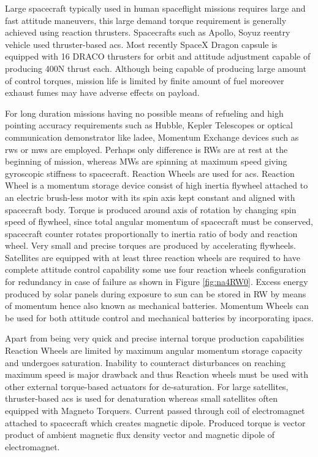 Large spacecraft typically used in human spaceflight missions requires large and fast attitude maneuvers, this large demand torque requirement is generally achieved using reaction thrusters. Spacecrafts such as Apollo, Soyuz reentry vehicle used thruster-based \acrshort{acs}. Most recently SpaceX Dragon capsule is equipped with 16 DRACO thrusters \cite{web:SpaceXDargon} for orbit and attitude adjustment capable of producing 400N thrust each.\cite{book:SPACEX} Although being capable of producing large amount of control torques, mission life is limited by finite amount of fuel moreover exhaust fumes may have adverse effects on payload.

For long duration missions having no possible means of refueling and high pointing accuracy requirements such as Hubble, Kepler Telescopes or optical communication demonstrator like \acrfull{ladee}, Momentum Exchange devices such as \acrfull{rws} or \acrfull{mws} are employed. Perhaps only difference is RWs are at rest at the beginning of mission, whereas MWs are spinning at maximum speed giving gyroscopic stiffness to spacecraft.
Reaction Wheels are used for \acrshort{acs}. Reaction Wheel is a momentum storage device consist of high inertia flywheel attached to an electric brush-less motor with its spin axis kept constant and aligned with spacecraft body. Torque is produced around axis of rotation by changing spin speed of flywheel, since total angular momentum of spacecraft must be conserved, spacecraft counter rotates proportionally to inertia ratio of body and reaction wheel. Very small and precise torques are produced by accelerating flywheels. Satellites are equipped with at least three reaction wheels are required to have complete attitude control capability some use four reaction wheels configuration for redundancy in case of failure as shown in Figure \ref{fig:na4RW0}. Excess energy produced by solar panels during exposure to sun can be stored in RW by means of momentum hence also known as mechanical batteries. Momentum Wheels can be used for both attitude control and mechanical batteries by incorporating \acrfull{ipacs}. \cite{TsiotrasPowerTracking} 

Apart from being very quick and precise internal torque production capabilities Reaction Wheels are limited by maximum angular momentum storage capacity and undergoes saturation. Inability to counteract disturbances on reaching maximum speed is major drawback and thus Reaction wheels must be used with other external torque-based actuators for de-saturation. For large satellites, thruster-based \acrshort{acs} is used for denaturation whereas small satellites often equipped with Magneto Torquers. Current passed through coil of electromagnet attached to spacecraft which creates magnetic dipole. Produced torque is vector product of ambient magnetic flux density vector and magnetic dipole of electromagnet.


